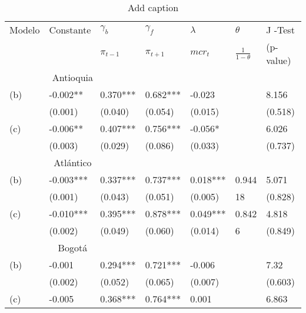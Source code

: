 
\begin{table}[H]
\centering
\caption{Add caption}
\begin{tabular}{lllllll}
\hline
Modelo & Constante  & $\gamma_{b}$  & $\gamma_{f}$ & $\lambda$   & $\theta$ & J -Test \\
 &       &   $\pi_{t-1}$    &    $\pi_{t+1}$    &  $mcr_{t}$    &   $\frac{1}{1-\theta}$    & (p-value) \\
\hline
\hline \multicolumn{3}{c}{Antioquia} &       &       & \multicolumn{1}{l}{} &  \\
\vspace{-0.3cm} (b) & -0.002** & 0.370*** & 0.682*** & -0.023 &       & 8.156\\   
 & \scriptsize{(0.001)} & \scriptsize{(0.040)} & \scriptsize{(0.054)} & \scriptsize{(0.015)} &       & \scriptsize{(0.518)} \\
\vspace{-0.3cm} (c) & -0.006** & 0.407*** & 0.756*** & -0.056* &       & 6.026\\   
& \scriptsize{(0.003)} & \scriptsize{(0.029)} & \scriptsize{(0.086)} & \scriptsize{(0.033)} &       & \scriptsize{(0.737)} \\
\hline \multicolumn{3}{c}{Atlántico} &       &       &       &  \\
\vspace{-0.3cm} (b) & -0.003*** & 0.337*** & 0.737*** & 0.018*** & 0.944 & 5.071\\   
& \scriptsize{(0.001)} & \scriptsize{(0.043)} & \scriptsize{(0.051)} & \scriptsize{(0.005)} & \scriptsize{18}    & \scriptsize{(0.828)} \\
\vspace{-0.3cm} (c) & -0.010*** & 0.395*** & 0.878*** & 0.049*** & 0.842 & 4.818\\   
& \scriptsize{(0.002)} & \scriptsize{(0.049)} & \scriptsize{(0.060)} & \scriptsize{(0.014)} & \scriptsize{6}    & \scriptsize{(0.849)} \\
\hline \multicolumn{3}{c}{Bogotá} &       &       &       &  \\
\vspace{-0.3cm} (b) & -0.001 & 0.294*** & 0.721*** & -0.006 &       & 7.32 \\  
& \scriptsize{(0.002)} & \scriptsize{(0.052)} & \scriptsize{(0.065)} & \scriptsize{(0.007)} &       & \scriptsize{(0.603)} \\
\vspace{-0.3cm} (c) & -0.005 & 0.368*** & 0.764*** & 0.001 &       & 6.863\\   

\end{tabular}
\end{table}
